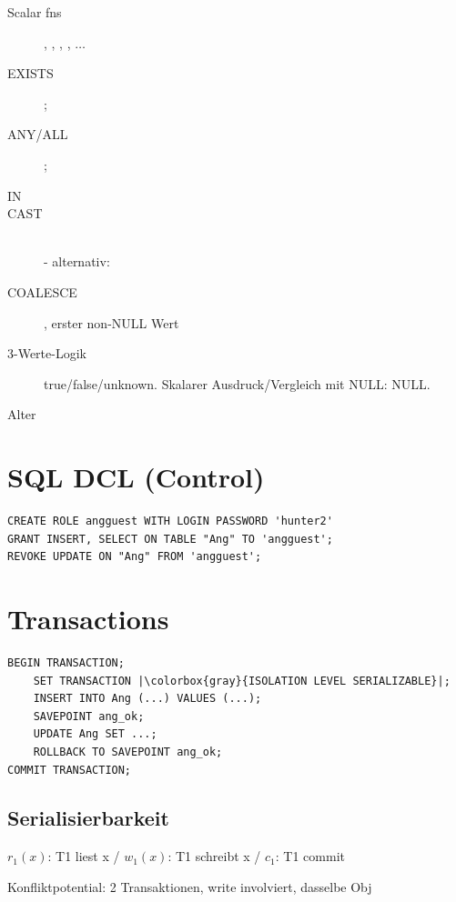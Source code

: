 \begin{multicols*}{3}
\begin{description}
\item[Scalar fns]{, , , , $\ldots$}
\item[EXISTS]{;}
\item[ANY/ALL]{;}
\item[IN]{}
\item[CAST]{ \\  - alternativ: }
\item[COALESCE]{, erster non-NULL Wert}
\item[3-Werte-Logik]{true/false/unknown. Skalarer Ausdruck/Vergleich mit NULL: NULL.}
\item[Alter]{}
\end{description}

\section{SQL DCL (Control)}
\begin{verbatim}
CREATE ROLE angguest WITH LOGIN PASSWORD 'hunter2'
GRANT INSERT, SELECT ON TABLE "Ang" TO 'angguest';
REVOKE UPDATE ON "Ang" FROM 'angguest';
\end{verbatim}

\section{Transactions}
\begin{verbatim}
BEGIN TRANSACTION;
    SET TRANSACTION |\colorbox{gray}{ISOLATION LEVEL SERIALIZABLE}|;
    INSERT INTO Ang (...) VALUES (...);
    SAVEPOINT ang_ok;
    UPDATE Ang SET ...;
    ROLLBACK TO SAVEPOINT ang_ok;
COMMIT TRANSACTION;
\end{verbatim}


\subsection{Serialisierbarkeit}
$r_{1}(x)$: T1 liest x / $w_{1}(x)$: T1 schreibt x / $c_{1}$: T1 commit

Konfliktpotential: 2 Transaktionen, write involviert, dasselbe Obj


\end{multicols*}
